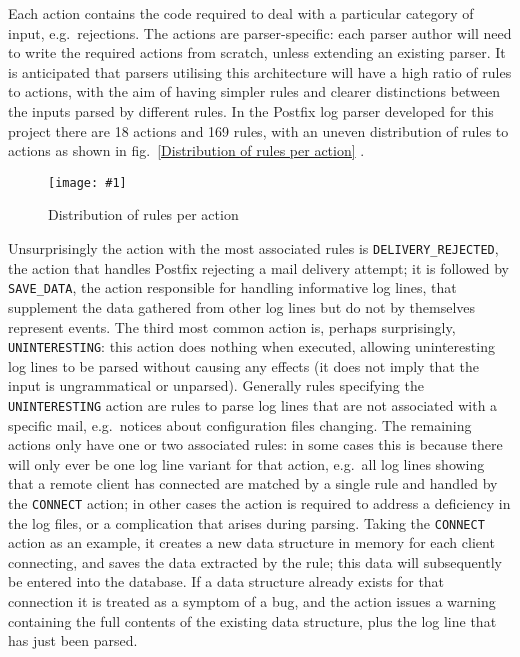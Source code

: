 \documentclass{svmult}
\newcommand{\showgraph}[3]{%
    \begin{figure}[btp]%
        \texttt{[image: \#1]}%
        \caption{#2}\label{#3}%
    \end{figure}%
}
\newcommand{\refwithlabel}[2]{%
    #1~\vref{#2}%
}
\newcommand{\graphref}[1]{%
    \refwithlabel{fig.}{#1}%
}
\newcommand{\numberOFrules}[0]{%
    169%
}
\newcommand{\numberOFactions}[0]{%
    18%
}
\begin{document}
Each action contains the code required to deal with a particular category
of input, e.g.\ rejections.  The actions are parser-specific: each parser
author will need to write the required actions from scratch, unless
extending an existing parser.  It is anticipated that parsers utilising
this architecture will have a high ratio of rules to actions, with the aim
of having simpler rules and clearer distinctions between the inputs parsed
by different rules.  In the Postfix log parser developed for this project
there are \numberOFactions{} actions and \numberOFrules{} rules, with an
uneven distribution of rules to actions as shown in \graphref{Distribution
of rules per action}.
\showgraph{build/graph-action-distribution}{Distribution of rules per
action}{Distribution of rules per action} Unsurprisingly the action with
the most associated rules is \texttt{DELIVERY\_REJECTED}, the action that
handles Postfix rejecting a mail delivery attempt; it is followed by
\texttt{SAVE\_DATA}, the action responsible for handling informative log
lines, that supplement the data gathered from other log lines but do not by
themselves represent events.  The third most common action is, perhaps
surprisingly, \texttt{UNINTERESTING}: this action does nothing when
executed, allowing uninteresting log lines to be parsed without causing any
effects (it does not imply that the input is ungrammatical or unparsed).
Generally rules specifying the \texttt{UNINTERESTING} action are rules to
parse log lines that are not associated with a specific mail, e.g.\ notices
about configuration files changing.  The remaining actions only have one or
two associated rules: in some cases this is because there will only ever be
one log line variant for that action, e.g.\ all log lines showing that a
remote client has connected are matched by a single rule and handled by the
\texttt{CONNECT} action; in other cases the action is required to address a
deficiency in the log files, or a complication that arises during parsing.
Taking the \texttt{CONNECT} action as an example, it creates a new data
structure in memory for each client connecting, and saves the data
extracted by the rule; this data will subsequently be entered into the
database.  If a data structure already exists for that connection it is
treated as a symptom of a bug, and the action issues a warning containing
the full contents of the existing data structure, plus the log line that
has just been parsed.
\end{document}
